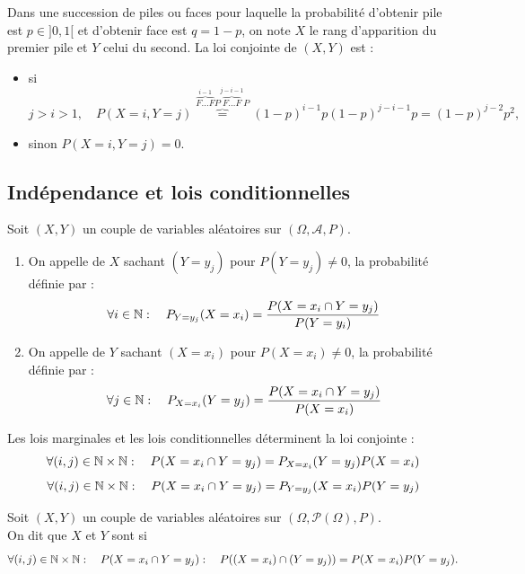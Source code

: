 \documentclass{book}
\begin{document}
\begin{Exemple}
Dans une succession de piles ou faces pour laquelle la probabilité d'obtenir pile est $p \in ]0,1[$ et d'obtenir
face est $q = 1 - p$, on note $X$ le rang d'apparition du premier pile et $Y$ celui du second. La loi
conjointe de $(X ,Y )$ est : 
\begin{itemize}
\item si $j>i>1, \quad P(X=i,Y=j)\overbrace{=}^{\overbrace{F\dots F}^{i-1}P\overbrace{F\dots F}^{j-i-1}P}(1-p)^{i-1}p(1-p)^{j-i-1}p=(1-p)^{j-2}p^2,$
\item sinon  $P(X=i,Y=j)=0$.
\end{itemize}
\end{Exemple}

\subsection{Indépendance et lois conditionnelles}
\begin{Definition}
Soit $(X,Y)$ un couple de variables aléatoires sur $(\Omega,\mathcal{A},P)$.\\
\begin{enumerate}
\item On appelle  de $X$ sachant $(Y = y_j )$ pour $P(Y = y_j )\neq 0$, la probabilité définie par  :
$$\forall i\in \mathbb{N}:\quad  P_{Y=y_j}(X=x_i)=\frac{P(X=x_i\cap Y=y_j) } {P(Y=y_i)}$$ 
\item On appelle  de $Y$ sachant $(X = x_i )$ pour $P(X = x_i )\neq 0$, la probabilité définie par  :
$$\forall j\in \mathbb{N}:\quad  P_{X=x_i}(Y=y_j)=\frac{P(X=x_i\cap Y=y_j) } {P(X=x_i)}$$ 
\end{enumerate}
\end{Definition}
\begin{Remarque}
Les lois marginales et les lois conditionnelles déterminent la loi conjointe :
$$\forall (i,j)\in \mathbb{N}\times \mathbb{N}:\quad P(X=x_i\cap Y=y_j)=P_{X=x_i}(Y=y_j)P(X=x_i)$$
$$\forall (i,j)\in \mathbb{N}\times \mathbb{N}:\quad P(X=x_i\cap Y=y_j)=P_{Y=y_j}(X=x_i)P(Y=y_j)$$
\end{Remarque}
\begin{Definition}[Indépendance]
Soit $(X,Y)$ un couple de variables aléatoires sur $(\Omega,\mathcal{P}(\Omega),P)$.\\
On dit que $X$ et $Y$ sont  si 
$$ \forall (i,j)\in \mathbb{N}\times \mathbb{N}:\quad P(X=x_i\cap Y=y_j):\quad P( (X=x_i)\cap (Y=y_j) ) = P(X=x_i) P(Y=y_j).$$
\end{Definition}
\end{document}
